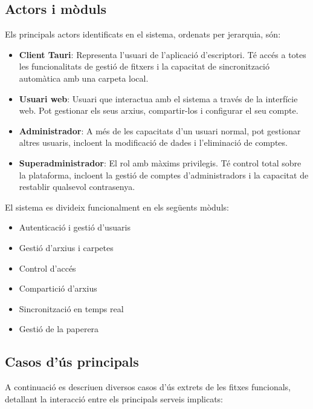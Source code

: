 \subsection{Actors i m\`oduls}
Els principals actors identificats en el sistema, ordenats per jerarquia, s\'on:
\begin{itemize}
  \item \textbf{Client Tauri}: Representa l'usuari de l'aplicació d'escriptori. Té accés a totes les funcionalitats de gestió de fitxers i la capacitat de sincronització automàtica amb una carpeta local.
  \item \textbf{Usuari web}: Usuari que interactua amb el sistema a través de la interfície web. Pot gestionar els seus arxius, compartir-los i configurar el seu compte.
  \item \textbf{Administrador}: A més de les capacitats d'un usuari normal, pot gestionar altres usuaris, incloent la modificació de dades i l'eliminació de comptes.
  \item \textbf{Superadministrador}: El rol amb màxims privilegis. Té control total sobre la plataforma, incloent la gestió de comptes d'administradors i la capacitat de restablir qualsevol contrasenya.
\end{itemize}

El sistema es divideix funcionalment en els seg\"uents m\`oduls:
\begin{itemize}
  \item Autenticaci\'o i gesti\'o d'usuaris
  \item Gesti\'o d'arxius i carpetes
  \item Control d'acc\'es
  \item Compartici\'o d'arxius
  \item Sincronitzaci\'o en temps real
  \item Gesti\'o de la paperera
\end{itemize}

\subsection{Casos d'\'us principals}
A continuació es descriuen diversos casos d'\'us extrets de les fitxes funcionals, detallant la interacció entre els principals serveis implicats:

